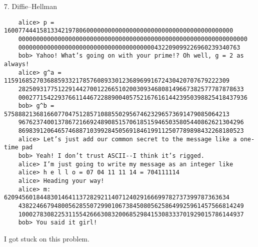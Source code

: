 \begin{problem}
  7. Diffie–Hellman

  \begin{Verbatim}
    alice> p = 1600774441581334219780600000000000000000000000000000000000000000
    0000000000000000000000000000000000000000000000000000000000000000
    00000000000000000000000000000000000000432209099226960239340763
    bob> Yahoo! What’s going on with your prime!? Oh well, g = 2 as always!
    alice> g^a = 115916852703688593321785760893301236896991672430420707679222309
    282509317751229144270012266510200309346808149667382577787878633
    0002771542293766114467228890040575216761614423950398825418437936
    bob> g^b = 575888213681660770475128571088550295674623296573691479085064213
    967623740013786721669248908515706185159465035805440862621304296
    869839120646574688710399284505691846199112507789898432268180523
    alice> Let’s just add our common secret to the message like a one-time pad
    bob> Yeah! I don’t trust ASCII--I think it’s rigged.
    alice> I’m just going to write my message as an integer like
    alice> h e l l o = 07 04 11 11 14 = 704111114
    alice> Heading your way!
    alice> m: 620945601844830146411372829211407124029166699782737399787363634
    438224667948005628550729901067384508056258649925961457566814249
    100027830822531155426663083200685298415308333701929015786144937
    bob> You said it girl!
  \end{Verbatim}
\end{problem}
\begin{Answer}
  I got stuck on this problem.

\end{Answer}
